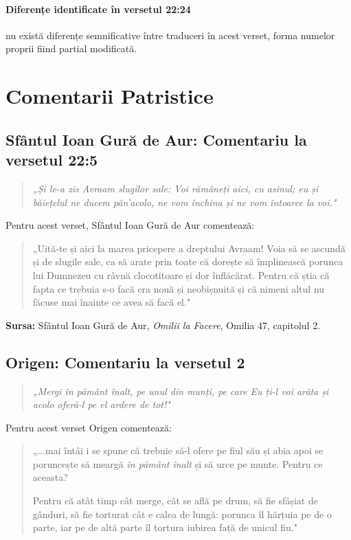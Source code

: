 \documentclass[12pt,a4paper]{article}
\begin{document}
\paragraph{Diferențe identificate în versetul 22:24}
nu există diferențe semnificative între traduceri în acest verset,
forma numelor proprii fiind partial modificată.


\section{Comentarii Patristice}

\subsection{Sfântul Ioan Gură de Aur: Comentariu la versetul 22:5}

\begin{quote}
    \textit{„Și le-a zis Avraam slugilor sale: Voi rămâneți aici, cu asinul; eu și băiețelul ne ducem pân'acolo, ne vom închina și ne vom întoarce la voi."}
\end{quote}

Pentru acest verset, Sfântul Ioan Gură de Aur comentează:

\begin{quote}
    „Uită-te și aici la marea pricepere a dreptului Avraam! Voia să se ascundă și de slugile sale, ca să arate prin toate că dorește să împlinească porunca lui Dumnezeu cu râvnă clocotitoare și dor înflăcărat. Pentru că știa că fapta ce trebuia s-o facă era nouă și neobișnuită și că nimeni altul nu făcuse mai înainte ce avea să facă el."
\end{quote}

\vspace{0.5cm}
\noindent\textbf{Sursa:} Sfântul Ioan Gură de Aur, \emph{Omilii la Facere}, Omilia 47, capitolul 2.



\subsection{Origen: Comentariu la versetul 2}

\begin{quote}
    \textit{„Mergi în pământ înalt, pe
        unul din munți, pe care Eu ți-l voi arăta și acolo
        oferă-l pe el ardere de tot!"}
\end{quote}

Pentru acest verset Origen comentează:
\begin{quote}
    „...mai întâi i se
    spune că trebuie să-l ofere pe fiul său și abia apoi se
    poruncește să meargă \emph{în pământ înalt} și să urce pe
    munte. Pentru ce aceasta?

    Pentru că atât timp cât merge, cât se află pe
    drum, să fie sfâșiat de gânduri, să fie torturat cât e
    calea de lungă: porunca îl hărțuia pe de o parte, iar
    pe de altă parte îl tortura iubirea față de unicul fiu."
\end{quote}
\end{document}
